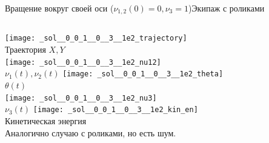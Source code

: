 \documentclass{beamer}
\begin{document}
\begin{frame}{Вращение вокруг своей оси ($\nu_{1,2}(0) = 0, \nu_3 = 1$)}{Экипаж с роликами}
    \begin{columns}
            \centering
            \texttt{[image: \_sol\_\_0\_0\_1\_\_0\_\_3\_\_1e2\_trajectory]} \\
            Траектория $X, Y$ \\
            \texttt{[image: \_sol\_\_0\_0\_1\_\_0\_\_3\_\_1e2\_nu12]} \\
            $\nu_1(t), \nu_2(t)$
            \centering
            \texttt{[image: \_sol\_\_0\_0\_1\_\_0\_\_3\_\_1e2\_theta]} \\
            $\theta(t)$ \\
            \texttt{[image: \_sol\_\_0\_0\_1\_\_0\_\_3\_\_1e2\_nu3]} \\
            $\nu_3(t)$
            \centering
            \texttt{[image: \_sol\_\_0\_0\_1\_\_0\_\_3\_\_1e2\_kin\_en]} \\
            Кинетическая энергия \\
            \vspace{15pt}
            Аналогично случаю с роликами, но есть шум.
    \end{columns}
\end{frame}
\end{document}
